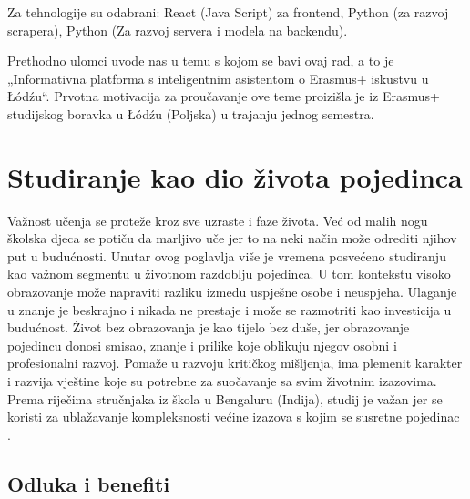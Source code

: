 \documentclass[]{foi}
\begin{document}
Za tehnologije su odabrani: React (Java Script) za frontend, Python (za razvoj scrapera), Python (Za razvoj servera i modela na backendu). 

Prethodno ulomci uvode nas u temu s kojom se bavi ovaj rad, a to je „Informativna platforma s inteligentnim asistentom o Erasmus+ 
iskustvu u Łódźu“. Prvotna motivacija za proučavanje ove teme proizišla je iz Erasmus+ studijskog boravka u Łódźu (Poljska) u trajanju jednog semestra.



\chapter{Studiranje kao dio života pojedinca}

Važnost učenja se proteže kroz sve uzraste i faze života. Već od malih nogu školska djeca se potiču da marljivo uče jer to na neki način može odrediti njihov put u budućnosti.
Unutar ovog poglavlja više je vremena posvećeno studiranju kao važnom segmentu u životnom razdoblju pojedinca. U tom kontekstu visoko obrazovanje može napraviti razliku između uspješne osobe
i neuspjeha. Ulaganje u znanje je beskrajno i nikada ne prestaje i može se razmotriti kao investicija u budućnost. Život bez obrazovanja je kao tijelo bez duše, jer obrazovanje pojedincu donosi smisao, 
znanje i prilike koje oblikuju njegov osobni i profesionalni razvoj. Pomaže u razvoju kritičkog mišljenja, ima plemenit karakter i razvija vještine koje su potrebne za suočavanje sa svim životnim izazovima. 
Prema riječima stručnjaka iz škola u Bengaluru (Indija), studij je važan jer se koristi za ublažavanje kompleksnosti većine izazova s kojim se susretne pojedinac \cite{digital3602025studies}. 



\section{Odluka i benefiti}
\end{document}
